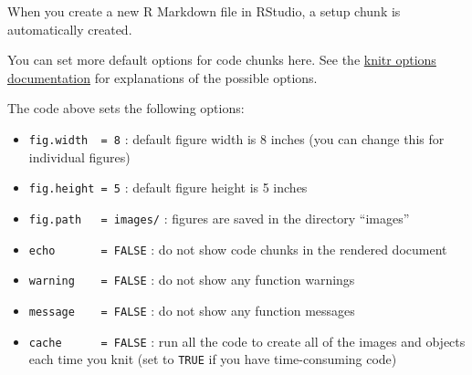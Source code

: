 \documentclass[
  oneside]{book}
\newenvironment{Shaded}{\begin{snugshade}}{\end{snugshade}}
\newcommand{\AttributeTok}[1]{\textcolor[rgb]{0.77,0.63,0.00}{#1}}
\newcommand{\ConstantTok}[1]{\textcolor[rgb]{0.00,0.00,0.00}{#1}}
\newcommand{\DecValTok}[1]{\textcolor[rgb]{0.00,0.00,0.81}{#1}}
\newcommand{\FunctionTok}[1]{\textcolor[rgb]{0.00,0.00,0.00}{#1}}
\newcommand{\NormalTok}[1]{#1}
\newcommand{\SpecialCharTok}[1]{\textcolor[rgb]{0.00,0.00,0.00}{#1}}
\newcommand{\StringTok}[1]{\textcolor[rgb]{0.31,0.60,0.02}{#1}}
\providecommand{\tightlist}{%
  \setlength{\itemsep}{0pt}\setlength{\parskip}{0pt}}
\begin{document}
When you create a new R Markdown file in RStudio, a setup chunk is automatically created.

\begin{Shaded}
\end{Shaded}

You can set more default options for code chunks here. See the \href{https://yihui.name/knitr/options/}{knitr options documentation} for explanations of the possible options.

\begin{Shaded}
\end{Shaded}

The code above sets the following options:

\begin{itemize}
\tightlist
\item
  \texttt{fig.width\ \ =\ 8} : default figure width is 8 inches (you can change this for individual figures)
\item
  \texttt{fig.height\ =\ 5} : default figure height is 5 inches
\item
  \texttt{fig.path\ \ \ =\ \textquotesingle{}images/\textquotesingle{}} : figures are saved in the directory ``images''
\item
  \texttt{echo\ \ \ \ \ \ \ =\ FALSE} : do not show code chunks in the rendered document
\item
  \texttt{warning\ \ \ \ =\ FALSE} : do not show any function warnings
\item
  \texttt{message\ \ \ \ =\ FALSE} : do not show any function messages
\item
  \texttt{cache\ \ \ \ \ \ =\ FALSE} : run all the code to create all of the images and objects each time you knit (set to \texttt{TRUE} if you have time-consuming code)
\end{itemize}
\end{document}
